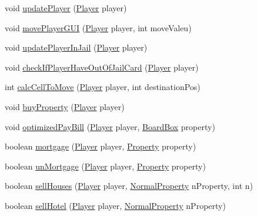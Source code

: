 \begin{DoxyCompactItemize}
\item 
void \hyperlink{class_monopoly_1_1_logic_1_1_game_a971fdb273d8d9a701bb7790c9cd83b39}{update\+Player} (\hyperlink{class_monopoly_1_1_logic_1_1_player}{Player} player)
\item 
void \hyperlink{class_monopoly_1_1_logic_1_1_game_a54d5653cfde38bb733ec4e6152353d73}{move\+Player\+G\+UI} (\hyperlink{class_monopoly_1_1_logic_1_1_player}{Player} player, int move\+Valeu)
\item 
void \hyperlink{class_monopoly_1_1_logic_1_1_game_a04e53f951804adcbcf299ff9e2848b3c}{update\+Player\+In\+Jail} (\hyperlink{class_monopoly_1_1_logic_1_1_player}{Player} player)
\item 
void \hyperlink{class_monopoly_1_1_logic_1_1_game_aedd3da09478a78baec3b3b8dc91a3e88}{check\+If\+Player\+Have\+Out\+Of\+Jail\+Card} (\hyperlink{class_monopoly_1_1_logic_1_1_player}{Player} player)
\item 
int \hyperlink{class_monopoly_1_1_logic_1_1_game_ab80a078ce9cc880d5f0cd341b6e244f2}{calc\+Cell\+To\+Move} (\hyperlink{class_monopoly_1_1_logic_1_1_player}{Player} player, int destination\+Pos)
\item 
void \hyperlink{class_monopoly_1_1_logic_1_1_game_a762472efc27ce244e217ed4135691cd9}{buy\+Property} (\hyperlink{class_monopoly_1_1_logic_1_1_player}{Player} player)
\item 
void \hyperlink{class_monopoly_1_1_logic_1_1_game_a16376d072bdb79b089175c1987d4cee3}{optimized\+Pay\+Bill} (\hyperlink{class_monopoly_1_1_logic_1_1_player}{Player} player, \hyperlink{class_monopoly_1_1_logic_1_1_board_box}{Board\+Box} property)
\item 
boolean \hyperlink{class_monopoly_1_1_logic_1_1_game_a4f2ca796eefae92abaef3567c31529b6}{mortgage} (\hyperlink{class_monopoly_1_1_logic_1_1_player}{Player} player, \hyperlink{class_monopoly_1_1_logic_1_1_property}{Property} property)
\item 
boolean \hyperlink{class_monopoly_1_1_logic_1_1_game_a87b6feb38e5e7faf048aa18f97924b9a}{un\+Mortgage} (\hyperlink{class_monopoly_1_1_logic_1_1_player}{Player} player, \hyperlink{class_monopoly_1_1_logic_1_1_property}{Property} property)
\item 
boolean \hyperlink{class_monopoly_1_1_logic_1_1_game_abc37caaae0d2c74b7ead5496cd427a1f}{sell\+Houses} (\hyperlink{class_monopoly_1_1_logic_1_1_player}{Player} player, \hyperlink{class_monopoly_1_1_logic_1_1_normal_property}{Normal\+Property} n\+Property, int n)
\item 
boolean \hyperlink{class_monopoly_1_1_logic_1_1_game_a66932e818bc37b923651493e00099e7f}{sell\+Hotel} (\hyperlink{class_monopoly_1_1_logic_1_1_player}{Player} player, \hyperlink{class_monopoly_1_1_logic_1_1_normal_property}{Normal\+Property} n\+Property)

\end{DoxyCompactItemize}
